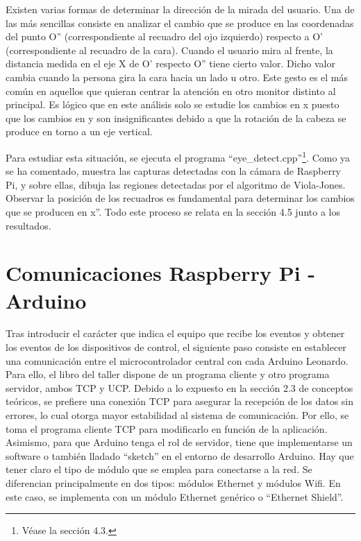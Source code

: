 Existen varias formas de determinar la dirección de la mirada del usuario. Una de las más sencillas consiste en analizar el cambio que se produce en las coordenadas del punto O'' (correspondiente al recuadro del ojo izquierdo) respecto a O' (correspondiente al recuadro de la cara). Cuando el usuario mira al frente, la distancia medida en el eje X de O' respecto O'' tiene cierto valor. Dicho valor cambia cuando la persona gira la cara hacia un lado u otro. Este gesto es el más común en aquellos que quieran centrar la atención en otro monitor distinto al principal. Es lógico que en este análisis solo se estudie los cambios en x puesto que los cambios en y son insignificantes debido a que la rotación de la cabeza se produce en torno a un eje vertical.

Para estudiar esta situación, se ejecuta el programa ``eye\_detect.cpp''\footnote{Véase la sección 4.3.}. Como ya se ha comentado, muestra las capturas detectadas con la cámara de Raspberry Pi, y sobre ellas, dibuja las regiones detectadas por el algoritmo de Viola-Jones. Observar la posición de los recuadros es fundamental para determinar los cambios que se producen en x''. Todo este proceso se relata en la sección 4.5 junto a los resultados.


\section{Comunicaciones Raspberry Pi - Arduino} \label{s3_5}

Tras introducir el carácter que indica el equipo que recibe los eventos y obtener los eventos de los dispositivos de control, el siguiente paso consiste en establecer una comunicación entre el microcontrolador central con cada Arduino Leonardo. Para ello, el libro del taller dispone de un programa cliente y otro programa servidor, ambos TCP y UCP. Debido a lo expuesto en la sección 2.3 de conceptos teóricos, se prefiere una conexión TCP para asegurar la recepción de los datos sin errores, lo cual otorga mayor estabilidad al sistema de comunicación. Por ello, se toma el programa cliente TCP para modificarlo en función de la aplicación. Asimismo, para que Arduino tenga el rol de servidor, tiene que implementarse un software o también lladado ``sketch'' en el entorno de desarrollo Arduino. Hay que tener claro el tipo de módulo que se emplea para conectarse a la red. Se diferencian principalmente en dos tipos: módulos Ethernet y módulos Wifi. En este caso, se implementa con un módulo Ethernet genérico o ``Ethernet Shield''.


